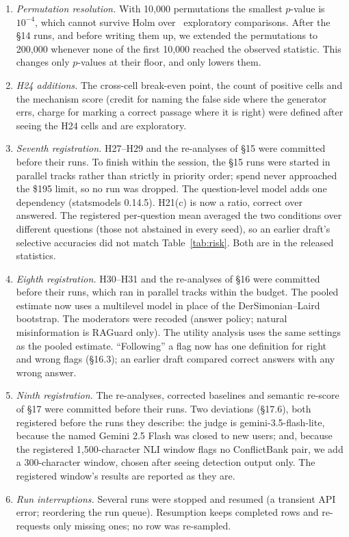 \begin{enumerate}[leftmargin=*,itemsep=1pt,topsep=2pt]
as a generator but not run, because no API key was available then. Claude rejects a temperature and JSON mode on the endpoint we used; it
ran at its default temperature, and as a detector its JSON is parsed by the detector's regex fallback. The answer
parser unwraps paired tags (\texttt{<answer>X</answer>}), which no earlier result contained.
\item \emph{Permutation resolution.} With 10,000 permutations the smallest $p$-value is $10^{-4}$, which cannot
survive Holm over \nExploratory\ exploratory comparisons. After the \S14 runs, and before writing them up, we
extended the permutations to 200,000 whenever none of the first 10,000 reached the observed statistic. This changes
only $p$-values at their floor, and only lowers them.
\item \emph{H24 additions.} The cross-cell break-even point, the count of positive cells and the mechanism score
(credit for naming the false side where the generator errs, charge for marking a correct passage where it is right)
were defined after seeing the H24 cells and are exploratory.
\item \emph{Seventh registration.} H27--H29 and the re-analyses of \S15 were committed before their runs. To finish
within the session, the \S15 runs were started in parallel tracks rather than strictly in priority order; spend never
approached the \$195 limit, so no run was dropped. The question-level model adds one dependency (statsmodels 0.14.5).
H21(c) is now a ratio, correct over answered. The registered per-question mean averaged the two conditions
over different questions (those not abstained in every seed), so an earlier draft's selective accuracies did
not match Table~\ref{tab:risk}. Both are in the released statistics.
\item \emph{Eighth registration.} H30--H31 and the re-analyses of \S16 were committed before their runs, which
ran in parallel tracks within the budget. The pooled estimate now uses a multilevel model in place of the
DerSimonian--Laird bootstrap. The moderators were recoded (answer policy; natural misinformation is RAGuard only).
The utility analysis uses the same settings as the pooled estimate. ``Following'' a flag now has one definition for
right and wrong flags (\S16.3); an earlier draft compared correct answers with any wrong answer.
\item \emph{Ninth registration.} The re-analyses, corrected baselines and semantic re-score of \S17 were committed
before their runs. Two deviations (\S17.6), both registered before the runs they describe: the judge is
gemini-3.5-flash-lite, because the named Gemini 2.5 Flash was closed to new users; and, because the registered
1,500-character NLI window flags no ConflictBank pair, we add a 300-character window, chosen after seeing
detection output only. The registered window's results are reported as they are.
\item \emph{Run interruptions.} Several runs were stopped and resumed (a transient API error; reordering the run
queue). Resumption keeps completed rows and re-requests only missing ones; no row was re-sampled.
\end{enumerate}
